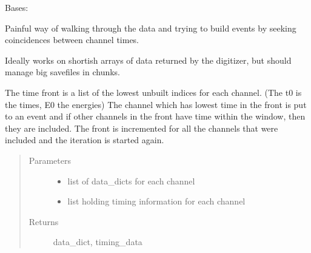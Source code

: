\documentclass[letterpaper,10pt,english]{sphinxmanual}
\begin{document}
\begin{fulllineitems}
\label{\detokenize{autodocs/data:listmode.data.EventBuilder}}
\sphinxAtStartPar
Bases: 

\sphinxAtStartPar
Painful way of walking through the data and trying to build events
by seeking coincidences between channel times.

\sphinxAtStartPar
Ideally works on shortish arrays of data returned by the digitizer, but should manage big savefiles in chunks.

\begin{fulllineitems}
\label{\detokenize{autodocs/data:listmode.data.EventBuilder.run_batch}}
\sphinxAtStartPar
The time front is a list of the lowest unbuilt indices for each channel.
(The t0 is the times, E0 the energies)
The channel which has lowest time in the front is put to an event
and if other channels in the front have time within the window, then
they are included. The front is incremented for all the channels that
were included and the iteration is started again.
\begin{quote}\begin{description}
\item[{Parameters}] \leavevmode\begin{itemize}
\item {} 
\sphinxAtStartPar
{} \textendash{} list of data\_dicts for each channel

\item {} 
\sphinxAtStartPar
{} \textendash{} list holding timing information for each channel

\end{itemize}

\item[{Returns}] \leavevmode
\sphinxAtStartPar
data\_dict, timing\_data

\end{description}\end{quote}

\end{fulllineitems}


\end{fulllineitems}
\end{document}
